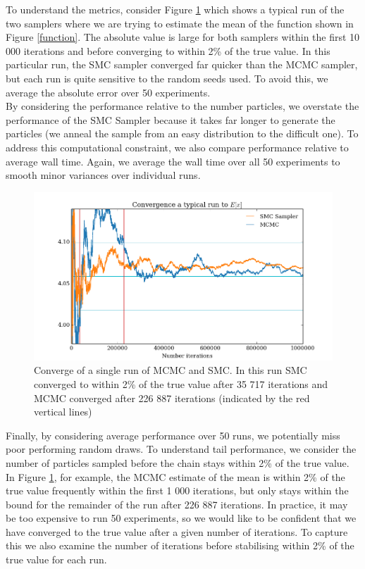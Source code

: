 \documentclass[12pt]{elsarticle}
\begin{document}
To understand the metrics, consider Figure \ref{convergence} which shows a typical run of the two samplers where we are trying to estimate the mean of the function shown in Figure \ref{function}. The absolute value is large for both samplers within the first 10 000 iterations and before converging to within 2\% of the true value. In this particular run, the SMC sampler converged far quicker than the MCMC sampler, but each run is quite sensitive to the random seeds used. To avoid this, we average the absolute error over 50 experiments. \\

By considering the performance relative to the number particles, we overstate the performance of the SMC Sampler because it takes far longer to generate the particles (we anneal the sample from an easy distribution to the difficult one). To address this computational constraint, we also compare performance relative to average wall time. Again, we average the wall time over all 50 experiments to smooth minor variances over individual runs. \\


\begin{figure}[htbp]
\begin{center}
\includegraphics[width = \textwidth]{plots/Convergence.png}
\caption{Converge of a single run of MCMC and SMC. In this run SMC converged to within 2\% of the true value after 35 717 iterations and MCMC converged after 226 887 iterations (indicated by the red vertical lines)}
\label{convergence}
\end{center}
\end{figure}

Finally, by considering average performance over 50 runs, we potentially miss poor performing random draws. To understand tail performance, we consider the number of particles sampled before the chain stays within 2\% of the true value. In Figure  \ref{convergence}, for example, the MCMC estimate of the mean is within 2\% of the true value frequently within the first 1 000 iterations, but only stays within the bound for the remainder of the run after 226 887 iterations. In practice, it may be too expensive to run 50 experiments, so we would like to be confident that we have converged to the true value after a given number of iterations. To capture this we also examine the number of iterations before stabilising within 2\% of the true value for each run.
\end{document}
